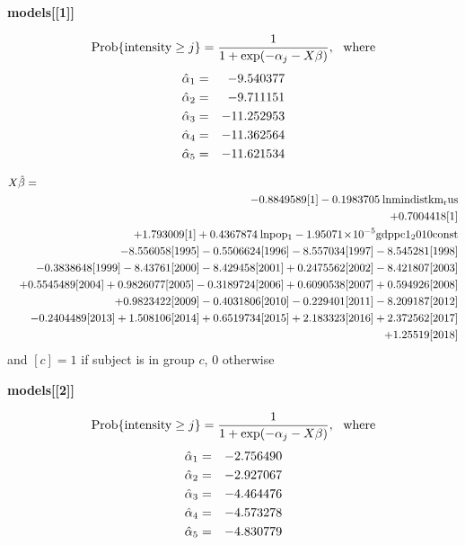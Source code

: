 \begin{center} \bf models[[1]] \end{center}
\[{\rm Prob}\{{\rm intensity}\geq j\} = \frac{1}{1+\exp(-\alpha_{j}-X\beta)}, {\rm \ \ where} \\ \]
\begin{eqnarray*}
\hat{\alpha}_{\rm 1} &=& -9.540377\\
\hat{\alpha}_{\rm 2} &=& -9.711151\\
\hat{\alpha}_{\rm 3} &=&-11.252953\\
\hat{\alpha}_{\rm 4} &=&-11.362564\\
\hat{\alpha}_{\rm 5} &=&-11.621534\\
\end{eqnarray*}

\begin{eqnarray*}
\lefteqn{X\hat{\beta}=}\\
& &  -0.8849589[{\rm 1}] -0.1983705\:{\rm lnmindistkm_rus} \\
& &  +0.7004418[{\rm 1}] \\
& &  +1.793009[{\rm 1}] +0.4367874\:{\rm lnpop_{1}} -1.95071\!\times\!10^{-5}{\rm gdppc1_2010const} \\
& &  -8.556058 [{\rm 1995}]-0.5506624[{\rm 1996}]-8.557034 [{\rm 1997}]-8.545281 [{\rm 1998}] \\
& &  -0.3838648[{\rm 1999}]-8.43761  [{\rm 2000}]-8.429458 [{\rm 2001}]+0.2475562 [{\rm 2002}]-8.421807 [{\rm 2003}] \\
& &  +0.5545489 [{\rm 2004}]+0.9826077 [{\rm 2005}]-0.3189724[{\rm 2006}]+0.6090538 [{\rm 2007}]+0.594926  [{\rm 2008}] \\
& &  +0.9823422 [{\rm 2009}]-0.4031806[{\rm 2010}]-0.229401 [{\rm 2011}]-8.209187 [{\rm 2012}] \\
& &  -0.2404489[{\rm 2013}]+1.508106  [{\rm 2014}]+0.6519734 [{\rm 2015}]+2.183323  [{\rm 2016}]+2.372562  [{\rm 2017}] \\
& &  +1.25519   [{\rm 2018}] \\
\end{eqnarray*}
and \([c]=1\) if subject is in group \(c\), 0 otherwise
\begin{center} \bf models[[2]] \end{center}
\[{\rm Prob}\{{\rm intensity}\geq j\} = \frac{1}{1+\exp(-\alpha_{j}-X\beta)}, {\rm \ \ where} \\ \]
\begin{eqnarray*}
\hat{\alpha}_{\rm 1} &=&-2.756490\\
\hat{\alpha}_{\rm 2} &=&-2.927067\\
\hat{\alpha}_{\rm 3} &=&-4.464476\\
\hat{\alpha}_{\rm 4} &=&-4.573278\\
\hat{\alpha}_{\rm 5} &=&-4.830779\\
\end{eqnarray*}

